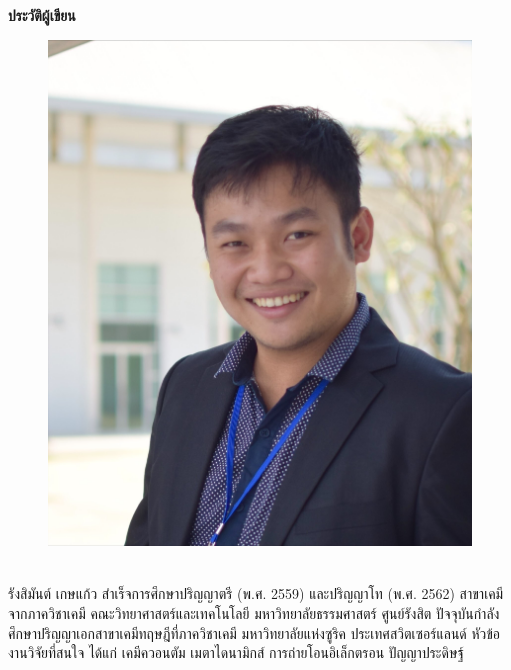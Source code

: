 

{
\thispagestyle{empty}

\begin{center}
    \LARGE\textbf{ประวัติผู้เขียน}
\end{center}

\begin{minipage}[t][8cm][t]{\textwidth}
    \begin{figure}
        \includegraphics[width=0.85\linewidth]{fig/RK-profile.jpg}
    \end{figure}
    \leavevmode
    \\
    \hspace*{1em} รังสิมันต์ เกษแก้ว สำเร็จการศึกษาปริญญาตรี (พ.ศ. 2559) และปริญญาโท (พ.ศ. 2562) สาขาเคมี จากภาควิชาเคมี 
    คณะวิทยาศาสตร์และเทคโนโลยี มหาวิทยาลัยธรรมศาสตร์ ศูนย์รังสิต ปัจจุบันกำลังศึกษาปริญญาเอกสาขาเคมีทฤษฎีที่ภาควิชาเคมี 
    มหาวิทยาลัยแห่งซูริค ประเทศสวิตเซอร์แลนด์ หัวข้องานวิจัยที่สนใจ ได้แก่ เคมีควอนตัม เมตาไดนามิกส์ การถ่ายโอนอิเล็กตรอน ปัญญาประดิษฐ์ 

\end{minipage}}
